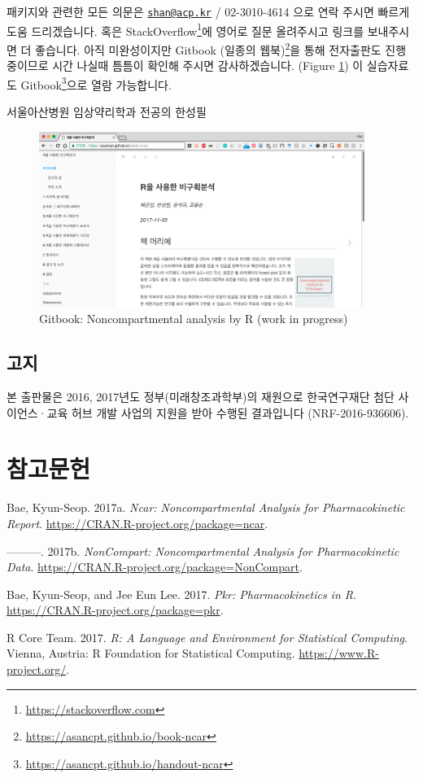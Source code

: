 \documentclass[9pt,]{krantz}
\begin{document}
패키지와 관련한 모든 의문은
\href{mailto:shan@acp.kr}{\nolinkurl{shan@acp.kr}} / 02-3010-4614 으로
연락 주시면 빠르게 도움 드리겠습니다. 혹은 StackOverflow\footnote{\url{https://stackoverflow.com}}에
영어로 질문 올려주시고 링크를 보내주시면 더 좋습니다. 아직 미완성이지만
Gitbook (일종의 웹북)\footnote{\url{https://asancpt.github.io/book-ncar}}을
통해 전자출판도 진행 중이므로 시간 나실때 틈틈이 확인해 주시면
감사하겠습니다. (Figure \ref{fig:gitbook}) 이 실습자료도
Gitbook\footnote{\url{https://asancpt.github.io/handout-ncar}}으로 열람
가능합니다.

서울아산병원 임상약리학과 전공의 한성필

\begin{figure}
\includegraphics[width=400px]{assets/gitbook} \caption{Gitbook: Noncompartmental analysis by R (work in progress)}\label{fig:gitbook}
\end{figure}

\section{고지}

본 출판물은 2016, 2017년도 정부(미래창조과학부)의 재원으로 한국연구재단
첨단 사이언스·교육 허브 개발 사업의 지원을 받아 수행된 결과입니다
(NRF-2016-936606).

\chapter{참고문헌}\label{references}

\hypertarget{refs}{}
\hypertarget{ref-R-ncar}{}
Bae, Kyun-Seop. 2017a. \emph{Ncar: Noncompartmental Analysis for
Pharmacokinetic Report}. \url{https://CRAN.R-project.org/package=ncar}.

\hypertarget{ref-R-NonCompart}{}
---------. 2017b. \emph{NonCompart: Noncompartmental Analysis for
Pharmacokinetic Data}.
\url{https://CRAN.R-project.org/package=NonCompart}.

\hypertarget{ref-R-pkr}{}
Bae, Kyun-Seop, and Jee Eun Lee. 2017. \emph{Pkr: Pharmacokinetics in
R}. \url{https://CRAN.R-project.org/package=pkr}.

\hypertarget{ref-R-base}{}
R Core Team. 2017. \emph{R: A Language and Environment for Statistical
Computing}. Vienna, Austria: R Foundation for Statistical Computing.
\url{https://www.R-project.org/}.
\end{document}
